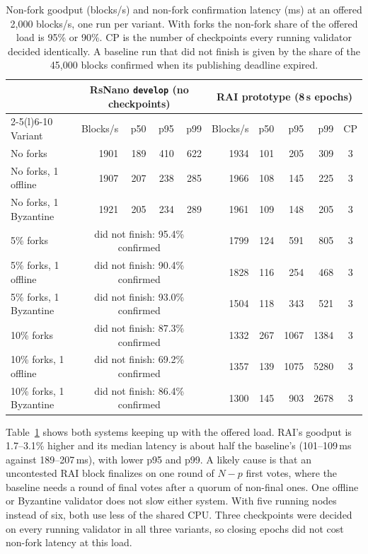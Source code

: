 \begin{table}[t]
\caption{Non-fork goodput (blocks/s) and non-fork confirmation latency (ms) at an offered 2{,}000 blocks/s, one run per variant. With forks the non-fork share of the offered load is 95\% or 90\%. CP is the number of checkpoints every running validator decided identically. A baseline run that did not finish is given by the share of the 45{,}000 blocks confirmed when its publishing deadline expired.}
\label{tab:eval}
\centering
\begin{tabular}{@{}lrrrrrrrrc@{}}
\toprule
& \multicolumn{4}{c}{RsNano \texttt{develop} (no checkpoints)} & \multicolumn{5}{c}{RAI prototype (8\,s epochs)}\\
\cmidrule(lr){2-5}\cmidrule(l){6-10}
Variant & Blocks/s & p50 & p95 & p99 & Blocks/s & p50 & p95 & p99 & CP\\
\midrule
No forks & 1901 & 189 & 410 & 622 & 1934 & 101 & 205 & 309 & 3\\
No forks, 1 offline & 1907 & 207 & 238 & 285 & 1966 & 108 & 145 & 225 & 3\\
No forks, 1 Byzantine & 1921 & 205 & 234 & 289 & 1961 & 109 & 148 & 205 & 3\\
\midrule
5\% forks & \multicolumn{4}{c}{did not finish: 95.4\% confirmed} & 1799 & 124 & 591 & 805 & 3\\
5\% forks, 1 offline & \multicolumn{4}{c}{did not finish: 90.4\% confirmed} & 1828 & 116 & 254 & 468 & 3\\
5\% forks, 1 Byzantine & \multicolumn{4}{c}{did not finish: 93.0\% confirmed} & 1504 & 118 & 343 & 521 & 3\\
\midrule
10\% forks & \multicolumn{4}{c}{did not finish: 87.3\% confirmed} & 1332 & 267 & 1067 & 1384 & 3\\
10\% forks, 1 offline & \multicolumn{4}{c}{did not finish: 69.2\% confirmed} & 1357 & 139 & 1075 & 5280 & 3\\
10\% forks, 1 Byzantine & \multicolumn{4}{c}{did not finish: 86.4\% confirmed} & 1300 & 145 & 903 & 2678 & 3\\
\bottomrule
\end{tabular}
\end{table}

Table~\ref{tab:eval} shows both systems keeping up with the offered load. RAI's goodput is 1.7--3.1\% higher and its median latency is about half the baseline's (101--109\,ms against 189--207\,ms), with lower p95 and p99. A likely cause is that an uncontested RAI block finalizes on one round of $N-p$ first votes, where the baseline needs a round of final votes after a quorum of non-final ones. One offline or Byzantine validator does not slow either system. With five running nodes instead of six, both use less of the shared CPU. Three checkpoints were decided on every running validator in all three variants, so closing epochs did not cost non-fork latency at this load.

